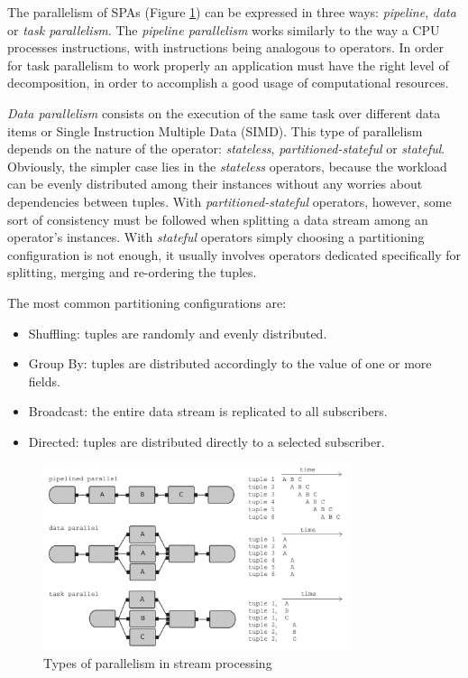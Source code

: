 \documentclass[ppgc,diss,english]{iiufrgs}
\begin{document}
The parallelism of SPAs (Figure \ref{fig:sps_parallelism}) can be expressed in three ways: \emph{pipeline}, \emph{data} or \emph{task parallelism}. The \emph{pipeline parallelism} works similarly to the way a CPU processes instructions, with instructions being analogous to operators. In order for task parallelism to work properly an application must have the right level of decomposition, in order to accomplish a good usage of computational resources.

\emph{Data parallelism} consists on the execution of the same task over different data items or Single Instruction Multiple Data (SIMD). This type of parallelism depends on the nature of the operator: \emph{stateless}, \emph{partitioned-stateful} or \emph{stateful}. Obviously, the simpler case lies in the \emph{stateless} operators, because the workload can be evenly distributed among their instances without any worries about dependencies between tuples. With \emph{partitioned-stateful} operators, however, some sort of consistency must be followed when splitting a data stream among an operator's instances. With \emph{stateful} operators simply choosing a partitioning configuration is not enough, it usually involves operators dedicated specifically for splitting, merging and re-ordering the tuples.

The most common partitioning configurations are:

\begin{itemize}
\item Shuffling: tuples are randomly and evenly distributed.
\item Group By: tuples are distributed accordingly to the value of one or more fields.
\item Broadcast: the entire data stream is replicated to all subscribers.
\item Directed: tuples are distributed directly to a selected subscriber.
\end{itemize}

\begin{figure}[!ht]
	\centering
	\includegraphics[width=0.8\textwidth]{images/sps_parallelism.png}
	\caption[Types of parallelism in stream processing]{Types of parallelism in stream processing \cite{andrade2014fundamentals}}
	\label{fig:sps_parallelism}
\end{figure}
\end{document}
